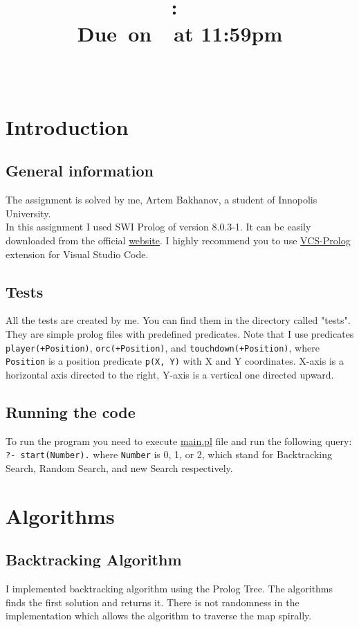 \documentclass{article}
\title{
    \vspace{2in}
    \textmd{\textbf{\hmwkClass:\ \hmwkTitle}}\\
    \normalsize\vspace{0.1in}\small{Due\ on\ \hmwkDueDate\ at 11:59pm}\\
    \vspace{0.1in}\large{\textit{\hmwkClassInstructor\ }}
    \vspace{3in}
}
\author{\hmwkAuthorName}
\date{}
\begin{document}
\maketitle

\pagebreak

\tableofcontents

\pagebreak

\section{Introduction}
\subsection{General information}
    The assignment is solved by me, Artem Bakhanov, a student of Innopolis University. \\
    In this assignment I used SWI Prolog of version 8.0.3-1. It can be easily downloaded from the official \href{https://www.swi-prolog.org/download/stable}{website}. I highly recommend you to use \href{https://marketplace.visualstudio.com/items?itemName=arthurwang.vsc-prolog}{VCS-Prolog} extension for Visual Studio Code. 
\subsection{Tests}
All the tests are created by me. You can find them in the directory called "tests". They are simple prolog files with predefined predicates. Note that I use predicates \texttt{player(+Position)}, \texttt{orc(+Position)}, and \texttt{touchdown(+Position)}, where \texttt{Position} is a position predicate \texttt{p(X, Y)} with X and Y coordinates. X-axis is a horizontal axis directed to the right, Y-axis is a vertical one directed upward. 

\subsection{Running the code}
To run the program you need to execute \url{main.pl} file and run the following query: \texttt{?- start(Number).} where \texttt{Number} is 0, 1, or 2, which stand for Backtracking Search, Random Search, and new Search respectively.

\section{Algorithms}
\subsection{Backtracking Algorithm}
I implemented backtracking algorithm using the Prolog Tree. The algorithms finds the first solution and returns it. There is not randomness in the implementation which allows the algorithm to traverse the map spirally.
\end{document}

